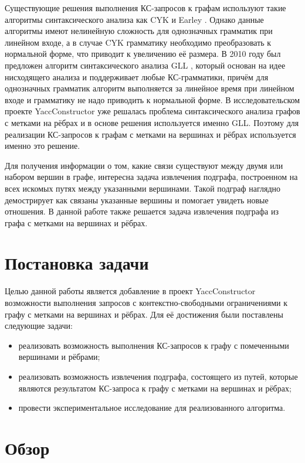 \documentclass[14pt]{matmex-diploma}
\begin{document}
  Существующие решения выполнения КС-запросов к графам используют такие алгоритмы синтаксического анализа как CYK и Earley \cite{subgraph, hellings2014conjunctive}. Однако данные алгоритмы имеют нелинейную сложность для однозначных грамматик при линейном входе, а в случае CYK грамматику необходимо преобразовать к нормальной форме, что приводит к увеличению её размера. В 2010 году был предложен алгоритм синтаксического анализа GLL \cite{gll}, который основан на идее нисходящего анализа и поддерживает любые КС-грамматики, причём для однозначных грамматик алгоритм выполняется за линейное время при линейном входе и грамматику не надо приводить к нормальной форме. В исследовательском проекте YaccConstructor \cite{YaccConstructorPage} уже решалась проблема синтаксического анализа графов с метками на рёбрах и в основе решения используется именно GLL. Поэтому для реализации КС-запросов к графам с метками на вершинах и рёбрах используется именно это решение.
  
   Для получения информации о том, какие связи существуют между двумя или набором вершин в графе, интересна задача извлечения подграфа, построенном на всех искомых путях между указанными вершинами. Такой подграф наглядно демострирует как связаны указанные вершины и помогает увидеть новые отношения. В данной работе также решается задача извлечения подграфа из графа с метками на вершинах и рёбрах.

\section{Постановка задачи}

Целью данной работы является добавление в проект YaccConstructor возможности выполнения запросов с контекстно-свободными ограничениями к графу с метками на вершинах и рёбрах. Для её достижения были поставлены следующие задачи:

\begin{itemize}
    \item реализовать возможность выполнения КС-запросов к графу с помеченными вершинами и рёбрами;
    \item реализовать возможность извлечения подграфа, состоящего из путей, которые являются результатом КС-запроса к графу с метками на вершинах и рёбрах;
    \item провести экспериментальное исследование для реализованного алгоритма.
    
\end{itemize}

\section{Обзор}
\end{document}
